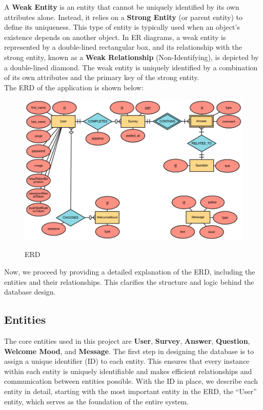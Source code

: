 \noindent A \textbf{Weak Entity} is an entity that cannot be uniquely identified by its own attributes alone. Instead, it relies on a \textbf{Strong Entity} (or parent entity) to define its uniqueness. This type of entity is typically used when an object’s existence depends on another object. In ER diagrams, a weak entity is represented by a double-lined rectangular box, and its relationship with the strong entity, known as a \textbf{Weak Relationship} (Non-Identifying), is depicted by a double-lined diamond. The weak entity is uniquely identified by a combination of its own attributes and the primary key of the strong entity.\vspace{5mm} \\
The ERD of the application is shown below:

\vspace{5mm}

\FloatBarrier
\begin{figure}[ht]
    \centering
    \includegraphics[width=\linewidth]{figures/database/ERD.png}
    \label{fig:erd}
    \caption{ERD}
\end{figure}
\FloatBarrier

\vspace{5mm}

\noindent Now, we proceed by providing a detailed explanation of the ERD, including the entities and their relationships. This clarifies the structure and logic behind the database design.

\subsection{Entities}
The core entities used in this project are \textbf{User}, \textbf{Survey}, \textbf{Answer}, \textbf{Question}, \textbf{Welcome Mood}, and \textbf{Message}. The first step in designing the database is to assign a unique identifier (ID) to each entity. This ensures that every instance within each entity is uniquely identifiable and makes efficient relationships and communication between entities possible. With the ID in place, we describe each entity in detail, starting with the most important entity in the ERD, the ``User'' entity, which serves as the foundation of the entire system.

